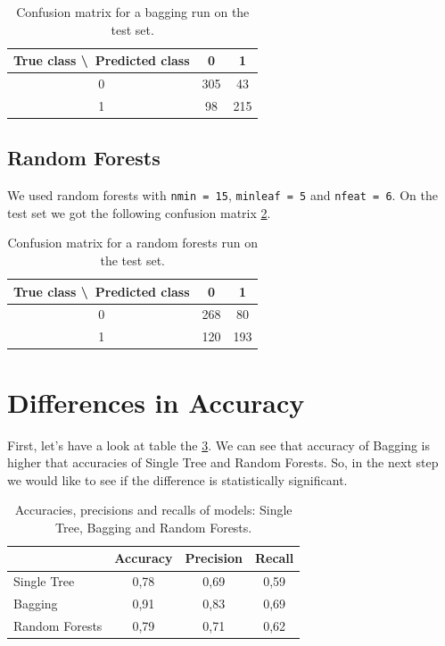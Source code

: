 \documentclass[a4paper,11pt]{article}
\begin{document}
\begin{table}[h!]
\centering
	\begin{tabular}{c||c|c}
	True class \textbackslash\ Predicted class & 0 & 1 \\ \hline \hline
	0 & 305 & 43 \\ \hline
	1 & 98 & 215
	\end{tabular}
	\caption{Confusion matrix for a bagging run on the test set.}
	\label{tab: bagging}
\end{table}



\subsection{Random Forests}
We used random forests with \verb|nmin = 15|, \verb|minleaf = 5| and  \verb|nfeat = 6|. On the test set we got the following confusion matrix \ref{tab: randomforest}.

\begin{table}[h!]
\centering
	\begin{tabular}{c||c|c}
	True class \textbackslash\ Predicted class & 0 & 1 \\ \hline \hline
	0 & 268 & 80 \\ \hline
	1 & 120 & 193
	\end{tabular}
	\caption{Confusion matrix for a random forests run on the test set.}
	\label{tab: randomforest}
\end{table}



\section{Differences in Accuracy}
First, let's have a look at table the \ref{tab: apr}. We can see that accuracy of Bagging is higher that accuracies of Single Tree and Random Forests. So, in the next step we would like to see if the difference is statistically significant.

\begin{table}[h!]
\centering
	\begin{tabular}{l||c|c|c}
	& Accuracy & Precision & Recall \\ \hline \hline
	Single Tree & 0{,}78 & 0{,}69 & 0{,}59 \\ \hline
	Bagging & 0{,}91 & 0{,}83 & 0{,}69 \\ \hline
	Random Forests & 0{,}79 & 0{,}71 & 0{,}62  
	\end{tabular}
	\caption{Accuracies, precisions and recalls of models: Single Tree, Bagging and Random Forests.}
	\label{tab: apr}
\end{table}
\end{document}
